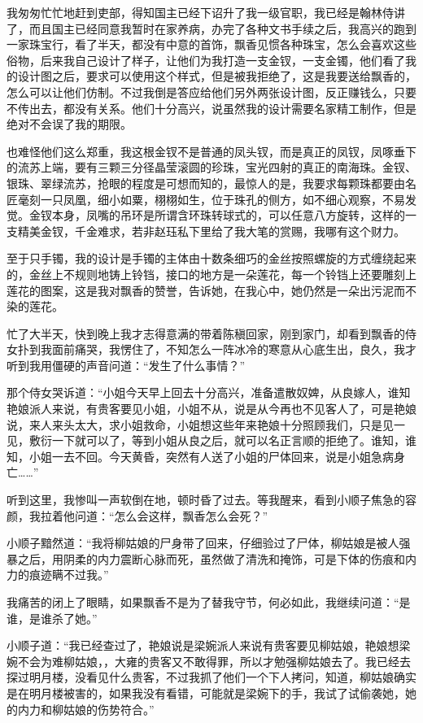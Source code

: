 我匆匆忙忙地赶到吏部，得知国主已经下诏升了我一级官职，我已经是翰林侍讲了，而且国主已经同意我暂时在家养病，办完了各种文书手续之后，我高兴的跑到一家珠宝行，看了半天，都没有中意的首饰，飘香见惯各种珠宝，怎么会喜欢这些俗物，后来我自己设计了样子，让他们为我打造一支金钗，一支金镯，他们看了我的设计图之后，要求可以使用这个样式，但是被我拒绝了，这是我要送给飘香的，怎么可以让他们仿制。不过我倒是答应给他们另外两张设计图，反正赚钱么，只要不传出去，都没有关系。他们十分高兴，说虽然我的设计需要名家精工制作，但是绝对不会误了我的期限。

也难怪他们这么郑重，我这根金钗不是普通的凤头钗，而是真正的凤钗，凤啄垂下的流苏上端，要有三颗三分径晶莹滚圆的珍珠，宝光四射的真正的南海珠。金钗、银珠、翠绿流苏，抢眼的程度是可想而知的，最惊人的是，我要求每颗珠都要由名匠毫刻一只凤凰，细小如粟，栩栩如生，位于珠孔的侧方，如不细心观察，不易发觉。金钗本身，凤嘴的吊环是所谓含环珠转球式的，可以任意八方旋转，这样的一支精美金钗，千金难求，若非赵珏私下里给了我大笔的赏赐，我哪有这个财力。

至于只手镯，我的设计是手镯的主体由十数条细巧的金丝按照螺旋的方式缠绕起来的，金丝上不规则地铸上铃铛，接口的地方是一朵莲花，每一个铃铛上还要雕刻上莲花的图案，这是我对飘香的赞誉，告诉她，在我心中，她仍然是一朵出污泥而不染的莲花。

忙了大半天，快到晚上我才志得意满的带着陈稹回家，刚到家门，却看到飘香的侍女扑到我面前痛哭，我愣住了，不知怎么一阵冰冷的寒意从心底生出，良久，我才听到我用僵硬的声音问道：“发生了什么事情？”

那个侍女哭诉道：“小姐今天早上回去十分高兴，准备遣散奴婢，从良嫁人，谁知艳娘派人来说，有贵客要见小姐，小姐不从，说是从今再也不见客人了，可是艳娘说，来人来头太大，求小姐救命，小姐想这些年来艳娘十分照顾我们，只是见一见，敷衍一下就可以了，等到小姐从良之后，就可以名正言顺的拒绝了。谁知，谁知，小姐一去不回。今天黄昏，突然有人送了小姐的尸体回来，说是小姐急病身亡……”

听到这里，我惨叫一声软倒在地，顿时昏了过去。等我醒来，看到小顺子焦急的容颜，我拉着他问道：“怎么会这样，飘香怎么会死？”

小顺子黯然道：“我将柳姑娘的尸身带了回来，仔细验过了尸体，柳姑娘是被人强暴之后，用阴柔的内力震断心脉而死，虽然做了清洗和掩饰，可是下体的伤痕和内力的痕迹瞒不过我。”

我痛苦的闭上了眼睛，如果飘香不是为了替我守节，何必如此，我继续问道：“是谁，是谁杀了她。”

小顺子道：“我已经查过了，艳娘说是梁婉派人来说有贵客要见柳姑娘，艳娘想梁婉不会为难柳姑娘，，大雍的贵客又不敢得罪，所以才勉强柳姑娘去了。我已经去探过明月楼，没看见什么贵客，不过我抓了他们一个下人拷问，知道，柳姑娘确实是在明月楼被害的，如果我没有看错，可能就是梁婉下的手，我试了试偷袭她，她的内力和柳姑娘的伤势符合。”

